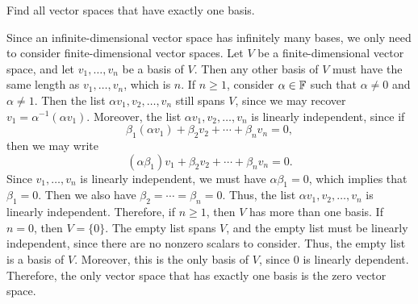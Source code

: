 \begin{exc}

\begin{exercise}
Find all vector spaces that have exactly one basis.
\end{exercise}
\begin{solution}

Since an infinite-dimensional vector space has infinitely many bases, we only
need to consider finite-dimensional vector spaces. Let $V$ be a
finite-dimensional vector space, and let $v_1,\dots,v_n$ be a basis of $V$. Then
any other basis of $V$ must have the same length as $v_1,\dots,v_n$, which is
$n$. If $n\ge1$, consider $\alpha\in\mathbb{F}$ such that $\alpha\ne0$ and $\alpha\ne1$.
Then the list $\alpha v_1,v_2,\dots,v_n$ still spans $V$, since we may recover
$v_1=\alpha^{-1}(\alpha v_1)$. Moreover, the list $\alpha v_1,v_2,\dots,v_n$ is
linearly independent, since if
\[ \beta_1(\alpha v_1)+\beta_2v_2+\cdots+\beta_nv_n = 0, \]
then we may write
\[ (\alpha\beta_1)v_1+\beta_2v_2+\cdots+\beta_nv_n = 0. \]
Since $v_1,\dots,v_n$ is linearly independent, we must have $\alpha\beta_1=0$,
which implies that $\beta_1=0$. Then we also have $\beta_2=\cdots=\beta_n=0$.
Thus, the list $\alpha v_1,v_2,\dots,v_n$ is linearly independent. Therefore, if
$n\ge1$, then $V$ has more than one basis. If $n=0$, then $V=\{0\}$. The empty
list spans $V$, and the empty list must be linearly independent, since there
are no nonzero scalars to consider. Thus, the empty list is a basis of $V$.
Moreover, this is the only basis of $V$, since $0$ is linearly dependent.
Therefore, the only vector space that has exactly one basis is the zero vector
space.
\end{solution}


\end{exc}
